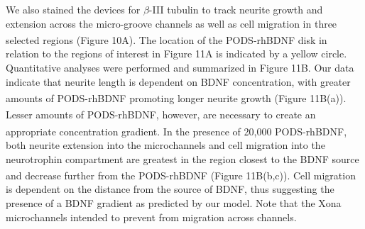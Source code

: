 \documentclass[review]{elsarticle}
\begin{document}
We also stained the devices for $\beta$-III tubulin to track neurite growth and extension across the micro-groove channels as well as cell migration in three selected regions (Figure 10A). The location of the PODS\textsuperscript{\textregistered}-rhBDNF disk in relation to the regions of interest in Figure 11A is indicated by a yellow circle. Quantitative analyses were performed and summarized in Figure 11B. Our data indicate that neurite length is dependent on BDNF concentration, with greater amounts of PODS\textsuperscript{\textregistered}-rhBDNF promoting longer neurite growth (Figure 11B(a)). Lesser amounts of PODS\textsuperscript{\textregistered}-rhBDNF, however, are necessary to create an appropriate concentration gradient. In the presence of 20,000 PODS\textsuperscript{\textregistered}-rhBDNF, both neurite extension into the microchannels and cell migration into the neurotrophin compartment are greatest in the region closest to the BDNF source and decrease further from the PODS\textsuperscript{\textregistered}-rhBDNF (Figure 11B(b,c)). Cell migration is dependent on the distance from the source of BDNF, thus suggesting the presence of a BDNF gradient as predicted by our model. Note that the Xona microchannels intended to prevent from migration across channels. 




\end{document}
